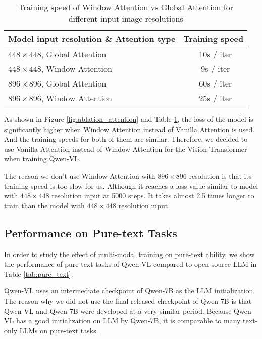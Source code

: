 \documentclass{article}
\newcommand{\tablestyle}[2]{\setlength{\tabcolsep}{#1}\renewcommand{\arraystretch}{#2}\centering\footnotesize}
\begin{document}
\begin{table}[htbp]
    \centering
    \tablestyle{7pt}{1.3}
    \caption{Training speed of Window Attention vs Global Attention for different input image resolutions}
    \begin{tabular}{l c}
         \toprule
         Model input resolution \& Attention type            & Training speed  \\
         \midrule
         $448\times448$, Global Attention        & ~10s / iter \\
         $448\times448$, Window Attention            & ~9s / iter \\
         $896\times896$, Global Attention      & ~60s / iter \\
         $896\times896$, Window Attention       & ~25s / iter \\
         \bottomrule
    \end{tabular}
    \label{tab:ablation_attention}
\end{table}

As shown in Figure \ref{fig:ablation_attention} and Table \ref{tab:ablation_attention}, the loss of the model is significantly higher when Window Attention instead of Vanilla Attention is used. And the training speeds for both of them are similar. Therefore, we decided to use Vanilla Attention instead of Window Attention for the Vision Transformer when training Qwen-VL.

The reason we don't use Window Attention with $896\times896$ resolution is that its training speed is too slow for us. Although it reaches a loss value similar to model with $448 \times 448$ resolution input at 5000 steps. It takes almost 2.5 times longer to train than the model with $448 \times 448$ resolution input.


\subsection{Performance on Pure-text Tasks}

In order to study the effect of multi-modal training on pure-text ability, we show the performance of pure-text tasks of Qwen-VL compared to open-source LLM in Table \ref{tab:pure_text}.

Qwen-VL uses an intermediate checkpoint of Qwen-7B as the LLM initialization. The reason why we did not use the final released checkpoint of Qwen-7B is that Qwen-VL and Qwen-7B were developed at a very similar period. Because Qwen-VL has a good initialization on LLM by Qwen-7B, it is comparable to many text-only LLMs on pure-text tasks.
\end{document}
